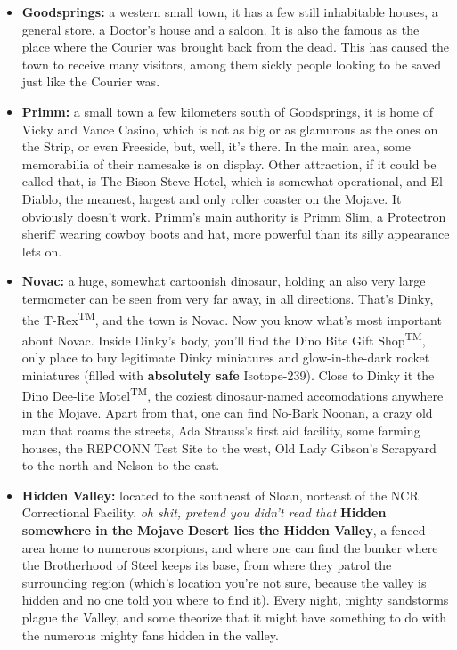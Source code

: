 \documentclass[11pt]{article} %
\begin{document}
\begin{itemize}
\item \textbf{Goodsprings:} a western small town, it has a few still inhabitable houses, a general store, a Doctor's house and a saloon. It is also the famous as the place where the Courier was brought back from the dead. This has caused the town to receive many visitors, among them sickly people looking to be saved just like the Courier was.

\item \textbf{Primm:} a small town a few kilometers south of Goodsprings, it is home of Vicky and Vance Casino, which is not as big or as glamurous as the ones on the Strip, or even Freeside, but, well, it's there. In the main area, some memorabilia of their namesake is on display. Other attraction, if it could be called that, is The Bison Steve Hotel, which is somewhat operational, and El Diablo, the meanest, largest and only roller coaster on the Mojave. It obviously doesn't work. Primm's main authority is Primm Slim, a Protectron sheriff wearing cowboy boots and hat, more powerful than its silly appearance lets on.

\item \textbf{Novac:} a huge, somewhat cartoonish dinosaur, holding an also very large termometer can be seen from very far away, in all directions. That's Dinky, the T-Rex\textsuperscript{TM\textregistered}, and the town is Novac. Now you know what's most important about Novac. Inside Dinky's body, you'll find the Dino Bite Gift Shop\textsuperscript{TM\textregistered}, only place to buy legitimate Dinky miniatures and glow-in-the-dark rocket miniatures (filled with \textbf{absolutely safe} Isotope-239). Close to Dinky it the Dino Dee-lite Motel\textsuperscript{TM\textregistered}, the coziest dinosaur-named accomodations anywhere in the Mojave. Apart from that, one can find No-Bark Noonan, a crazy old man that roams the streets, Ada Strauss's first aid facility, some farming houses, the REPCONN Test Site to the west, Old Lady Gibson's Scrapyard to the north and Nelson to the east. 

\item \textbf{Hidden Valley:} located to the southeast of Sloan, norteast of the NCR Correctional Facility, \textit{oh shit, pretend you didn't read that} \textbf{Hidden somewhere in the Mojave Desert lies the Hidden Valley}, a fenced area home to numerous scorpions, and where one can find the bunker where the Brotherhood of Steel keeps its base, from where they patrol the surrounding region (which's location you're not sure, because the valley is hidden and no one told you where to find it). Every night, mighty sandstorms plague the Valley, and some theorize that it might have something to do with the numerous mighty fans hidden in the valley.


\end{itemize}
\end{document}

